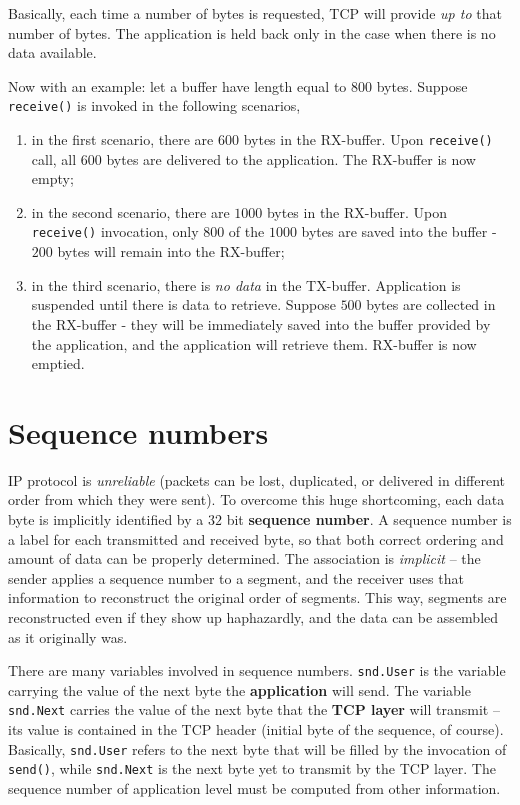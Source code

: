 \documentclass[10pt]{book}
\begin{document}
Basically, each time a number of bytes is requested, TCP will provide \emph{up
to} that number of bytes. The application is held back only in the case when there
is no data available.

Now with an example: let a buffer have length equal to $800$ bytes. Suppose
\texttt{receive()} is invoked in the following scenarios,
\begin{enumerate}
    \item in the first scenario, there are $600$ bytes in the RX-buffer. Upon
        \texttt{receive()} call, all $600$ bytes are delivered to the
        application. The RX-buffer is now empty;
    \item in the second scenario, there are $1000$ bytes in the RX-buffer. Upon
        \texttt{receive()} invocation, only $800$ of the $1000$ bytes are saved
        into the buffer \-- $200$ bytes will remain into the RX-buffer;
    \item in the third scenario, there is \emph{no data} in the TX-buffer.
        Application is suspended until there is data to retrieve. Suppose $500$
        bytes are collected in the RX-buffer \-- they will be immediately saved
        into the buffer provided by the application, and the application will
        retrieve them. RX-buffer is now emptied.
\end{enumerate}


\section{Sequence numbers}

IP protocol is \emph{unreliable} (packets can be lost, duplicated, or delivered
in different order from which they were sent). To overcome this huge
shortcoming, each data byte is implicitly identified by a $32$ bit
\textbf{sequence number}. A sequence number is a label for each transmitted and
received byte, so that both correct ordering and amount of data can be properly
determined. The association is \emph{implicit} \--- the sender applies a
sequence number to a segment, and the receiver uses that information to
reconstruct the original order of segments. This way, segments are
reconstructed even if they show up haphazardly, and the data can be assembled
as it originally was.

There are many variables involved in sequence numbers. \texttt{snd.User} is the
variable carrying the value of the next byte the \textbf{application} will
send. The variable \texttt{snd.Next} carries the value of the next byte that
the \textbf{TCP layer} will transmit \--- its value is contained in the TCP
header (initial byte of the sequence, of course). Basically, \texttt{snd.User}
refers to the next byte that will be filled by the invocation of
\texttt{send()}, while \texttt{snd.Next} is the next byte yet to transmit by
the TCP layer. The sequence number of application level must be computed from
other information. 
\end{document}
